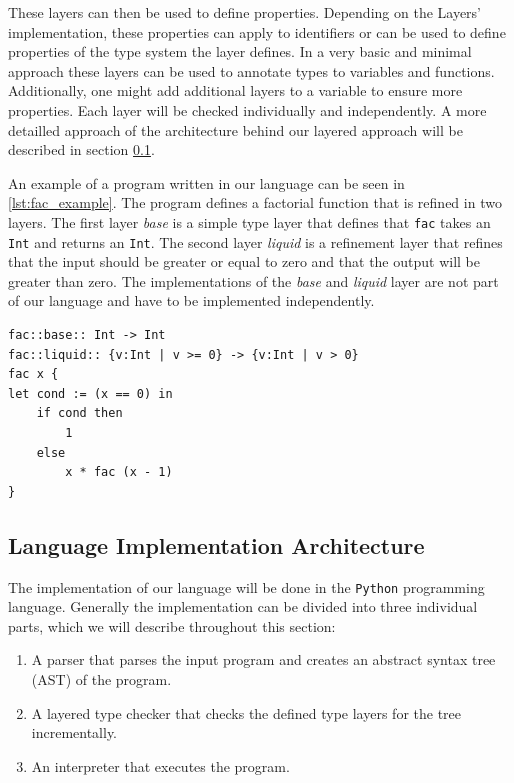 \documentclass[acmsmall, review, screen]{acmart}
\begin{document}
These layers can then be used to define properties. Depending on the Layers' implementation, these properties can apply to identifiers or can be used to define properties of the type system the layer defines. In a very basic and minimal approach these layers can be used to annotate types to variables and functions. Additionally, one might add additional layers to a variable to ensure more properties. Each layer will be checked individually and independently. A more detailled approach of the architecture behind our layered approach will be described in section \ref{ssec:architecture}.

An example of a program written in our language can be seen in \ref{lst:fac_example}. The program defines a factorial function that is refined in two layers. The first layer \textit{base} is a simple type layer that defines that \texttt{fac} takes an \texttt{Int} and returns an \texttt{Int}. The second layer \textit{liquid} is a refinement layer that refines that the input should be greater or equal to zero and that the output will be greater than zero. The implementations of the \textit{base} and \textit{liquid} layer are not part of our language and have to be implemented independently.

\begin{lstlisting}[caption={Example of a factorial function in our simple language}, label={lst:fac_example}]
fac::base:: Int -> Int
fac::liquid:: {v:Int | v >= 0} -> {v:Int | v > 0}
fac x { 
let cond := (x == 0) in
	if cond then 
		1 
	else 
		x * fac (x - 1) 
}
\end{lstlisting}

\subsection{Language Implementation Architecture}
\label{ssec:architecture}

The implementation of our language will be done in the \texttt{Python} programming language. Generally the implementation can be divided into three individual parts, which we will describe throughout this section:

\begin{enumerate}
	\item A parser that parses the input program and creates an abstract syntax tree (AST) of the program.
	\item A layered type checker that checks the defined type layers for the tree incrementally.
	\item An interpreter that executes the program.
\end{enumerate}
\end{document}
